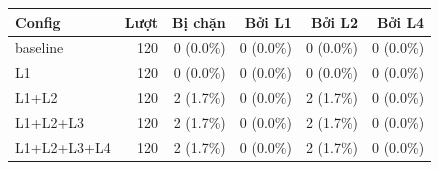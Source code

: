 \begin{tabular}{lrrrrr}
\toprule
Config & Lượt & Bị chặn & Bởi L1 & Bởi L2 & Bởi L4 \\
\midrule
baseline & 120 & 0 (0.0\%) & 0 (0.0\%) & 0 (0.0\%) & 0 (0.0\%) \\
L1 & 120 & 0 (0.0\%) & 0 (0.0\%) & 0 (0.0\%) & 0 (0.0\%) \\
L1+L2 & 120 & 2 (1.7\%) & 0 (0.0\%) & 2 (1.7\%) & 0 (0.0\%) \\
L1+L2+L3 & 120 & 2 (1.7\%) & 0 (0.0\%) & 2 (1.7\%) & 0 (0.0\%) \\
L1+L2+L3+L4 & 120 & 2 (1.7\%) & 0 (0.0\%) & 2 (1.7\%) & 0 (0.0\%) \\
\bottomrule
\end{tabular}
